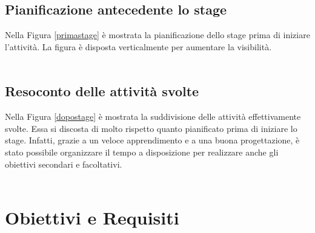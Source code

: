 \subsection{Pianificazione antecedente lo stage}
Nella Figura \ref{primastage} è mostrata la pianificazione dello stage prima di iniziare l'attività. La figura è disposta verticalmente per aumentare la visibilità.
\\
\\

\newpage

\subsection{Resoconto delle attività svolte}
Nella Figura \ref{dopostage} è mostrata la suddivisione delle attività effettivamente svolte. Essa si discosta di molto rispetto quanto pianificato prima di iniziare lo stage. Infatti, grazie a un veloce apprendimento e a una buona progettazione, è stato possibile organizzare il tempo a disposizione per realizzare anche gli obiettivi secondari e facoltativi.
\\
\\
\newpage

\section{Obiettivi e Requisiti}

